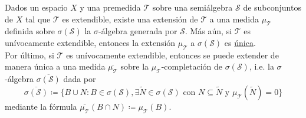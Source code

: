 \begin{theorem}
	Dados un espacio $X$ y una premedida $\mathcal{T}$ sobre una semiálgebra $\mathscr{S}$ de subconjuntos de $X$ tal que $\mathcal{T}$ es extendible, existe una extensión de $\mathcal{T}$ a una medida $\mu_{\mathcal{T}}$ definida sobre $\sigma(\mathscr{S})$ la $\sigma$-álgebra generada por $\mathscr{S}$. Más aún, si $\mathcal{T}$ es unívocamente extendible, entonces la extensión $\mu_{\mathcal{T}}$ a $\sigma(\mathscr{S})$ es \underline{única}. \\
	Por último, si $\mathcal{T}$ es unívocamente extendible, entonces se puede extender de manera única a una medida $\overline{\mu_{\mathcal{T}}}$ sobre la $\mu_{\mathcal{T}}$-completación de $\sigma(\mathscr{S})$, i.e. la $\sigma$-álgebra $\overline{\sigma(\mathscr{S})}$ dada por
	\[ \overline{\sigma(\mathscr{S})} \coloneq \{ B \cup N : B \in \sigma(\mathscr{S}), \exists \widetilde{N} \in \sigma(\mathscr{S}) \text{ con } N \subseteq \widetilde{N} \text{ y } \mu_{\mathcal{T}} (\widetilde{N}) = 0 \} \]
	\noindent mediante la fórmula $\overline{\mu_{\mathcal{T}}}(B\cap N) \coloneq \mu_{\mathcal{T}}(B)$.
\end{theorem}
